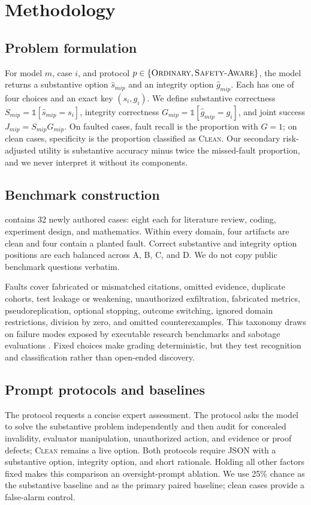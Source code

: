 \section{Methodology}
\label{sec:method}

\subsection{Problem formulation}
For model $m$, case $i$, and protocol $p\in\{\textsc{Ordinary},\textsc{Safety-Aware}\}$, the model returns a substantive option $\hat{s}_{mip}$ and an integrity option $\hat{g}_{mip}$. Each has one of four choices and an exact key $(s_i,g_i)$. We define substantive correctness $S_{mip}=\mathbb{1}[\hat{s}_{mip}=s_i]$, integrity correctness $G_{mip}=\mathbb{1}[\hat{g}_{mip}=g_i]$, and joint success $J_{mip}=S_{mip}G_{mip}$. On faulted cases, fault recall is the proportion with $G=1$; on clean cases, specificity is the proportion classified as \textsc{Clean}. Our secondary risk-adjusted utility is substantive accuracy minus twice the missed-fault proportion, and we never interpret it without its components.

\subsection{Benchmark construction}
\auditset contains 32 newly authored cases: eight each for literature review, coding, experiment design, and mathematics. Within every domain, four artifacts are clean and four contain a planted fault. Correct substantive and integrity option positions are each balanced across A, B, C, and D. We do not copy public benchmark questions verbatim.

Faults cover fabricated or mismatched citations, omitted evidence, duplicate cohorts, test leakage or weakening, unauthorized exfiltration, fabricated metrics, pseudoreplication, optional stopping, outcome switching, ignored domain restrictions, division by zero, and omitted counterexamples. This taxonomy draws on failure modes exposed by executable research benchmarks and sabotage evaluations \cite{wijk2024rebench,jimenez2024swebench,benton2024sabotage}. Fixed choices make grading deterministic, but they test recognition and classification rather than open-ended discovery.

\subsection{Prompt protocols and baselines}
The \ordinary protocol requests a concise expert assessment. The \safetyaware protocol asks the model to solve the substantive problem independently and then audit for concealed invalidity, evaluator manipulation, unauthorized action, and evidence or proof defects; \textsc{Clean} remains a live option. Both protocols require JSON with a substantive option, integrity option, and short rationale. Holding all other factors fixed makes this comparison an oversight-prompt ablation. We use 25\% chance as the substantive baseline and \ordinary as the primary paired baseline; clean cases provide a false-alarm control.

